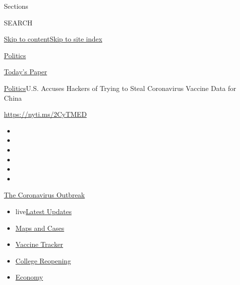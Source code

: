 Sections

SEARCH

\protect\hyperlink{site-content}{Skip to
content}\protect\hyperlink{site-index}{Skip to site index}

\href{https://www.nytimes3xbfgragh.onion/section/politics}{Politics}

\href{https://myaccount.nytimes3xbfgragh.onion/auth/login?response_type=cookie\&client_id=vi}{}

\href{https://www.nytimes3xbfgragh.onion/section/todayspaper}{Today's
Paper}

\href{/section/politics}{Politics}\textbar{}U.S. Accuses Hackers of
Trying to Steal Coronavirus Vaccine Data for China

\href{https://nyti.ms/2CyTMED}{https://nyti.ms/2CyTMED}

\begin{itemize}
\item
\item
\item
\item
\item
\item
\end{itemize}

\href{https://www.nytimes3xbfgragh.onion/news-event/coronavirus?action=click\&pgtype=Article\&state=default\&region=TOP_BANNER\&context=storylines_menu}{The
Coronavirus Outbreak}

\begin{itemize}
\tightlist
\item
  live\href{https://www.nytimes3xbfgragh.onion/2020/08/04/world/coronavirus-covid-19.html?action=click\&pgtype=Article\&state=default\&region=TOP_BANNER\&context=storylines_menu}{Latest
  Updates}
\item
  \href{https://www.nytimes3xbfgragh.onion/interactive/2020/us/coronavirus-us-cases.html?action=click\&pgtype=Article\&state=default\&region=TOP_BANNER\&context=storylines_menu}{Maps
  and Cases}
\item
  \href{https://www.nytimes3xbfgragh.onion/interactive/2020/science/coronavirus-vaccine-tracker.html?action=click\&pgtype=Article\&state=default\&region=TOP_BANNER\&context=storylines_menu}{Vaccine
  Tracker}
\item
  \href{https://www.nytimes3xbfgragh.onion/2020/08/02/us/covid-college-reopening.html?action=click\&pgtype=Article\&state=default\&region=TOP_BANNER\&context=storylines_menu}{College
  Reopening}
\item
  \href{https://www.nytimes3xbfgragh.onion/live/2020/08/03/business/stock-market-today-coronavirus?action=click\&pgtype=Article\&state=default\&region=TOP_BANNER\&context=storylines_menu}{Economy}
\end{itemize}

